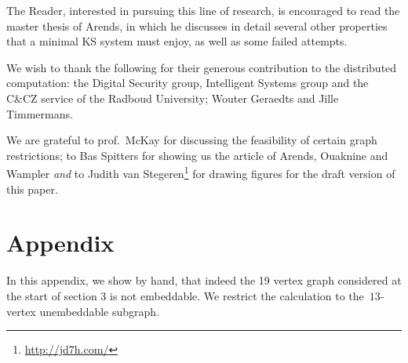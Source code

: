 \documentclass{report}
\begin{document}
The Reader, interested in pursuing this line of research,
is encouraged to read the master thesis\cite{a09} of Arends,
in which he discusses in detail several other
properties that a minimal KS system must enjoy, as well as
some failed attempts.

\begin{acknowledgment}
We wish to thank the following for their generous contribution to the
distributed computation:
    the Digital Security group, Intelligent Systems group
    and the C\&CZ service of the Radboud University;
    Wouter Geraedts and
    Jille Timmermans.

We are grateful to prof.~McKay for discussing the feasibility of
certain graph restrictions; to Bas Spitters for showing us the
article of Arends, Ouaknine and Wampler \emph{and} to Judith van
Stegeren\footnote{\url{http://jd7h.com/}} for drawing figures for
the draft version of this paper.
\end{acknowledgment}

\clearpage
{}


\appendix
\clearpage
\section{Appendix}
In this appendix, we show by hand, that indeed the 19 vertex graph
considered at the start of section 3 %
is not embeddable.
We restrict the calculation to the~$13$-vertex unembeddable
subgraph.
\end{document}
